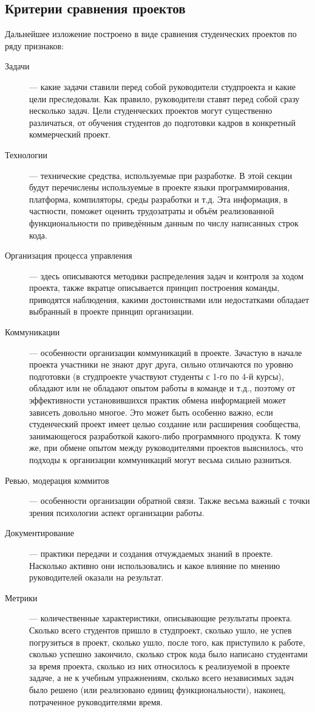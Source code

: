 \documentclass[a5paper]{article}
\begin{document}
\subsection{Критерии сравнения проектов}
Дальнейшее изложение построено в виде сравнения студенческих проектов по ряду признаков:
\begin{description}
	\item[Задачи] --- какие задачи ставили перед собой руководители студпроекта и какие цели преследовали. Как правило, руководители ставят перед собой сразу несколько задач. Цели студенческих проектов могут существенно различаться, от обучения студентов до подготовки кадров в конкретный коммерческий проект.
	\item[Технологии] --- технические средства, используемые при разработке. В этой секции будут перечислены используемые в проекте языки программирования, платформа, компиляторы, среды разработки и т.д. Эта информация, в частности, поможет оценить трудозатраты и объём реализованной функциональности по приведённым данным по числу написанных строк кода.
	\item[Организация процесса управления] --- здесь описываются методики распределения задач и контроля за ходом проекта, также вкратце описывается принцип построения команды, приводятся наблюдения, какими достоинствами или недостатками обладает выбранный в проекте принцип организации.
	\item[Коммуникации] --- особенности организации коммуникаций в проекте. Зачастую в начале проекта участники не знают друг друга, сильно отличаются по уровню подготовки (в студпроекте участвуют студенты с 1-го по 4-й курсы), обладают или не обладают опытом работы в команде и т.д., поэтому от эффективности установившихся практик обмена информацией может зависеть довольно многое. Это может быть особенно важно, если студенческий проект имеет целью создание или расширения сообщества, занимающегося разработкой какого-либо программного продукта. К тому же, при обмене опытом между руководителями проектов выяснилось, что подходы к организации коммуникаций могут весьма сильно разниться.
	\item[Ревью, модерация коммитов] --- особенности организации обратной связи. Также весьма важный с точки зрения психологии аспект организации работы.
	\item[Документирование] --- практики передачи и создания отчуждаемых знаний в проекте. Насколько активно они использовались и какое влияние по мнению руководителей оказали на результат.
	\item[Метрики] --- количественные характеристики, описывающие результаты проекта. Сколько всего студентов пришло в студпроект, сколько ушло, не успев погрузиться в проект, сколько ушло, после того, как приступило к работе, сколько успешно закончило, сколько строк кода было написано студентами за время проекта, сколько из них относилось к реализуемой в проекте задаче, а не к учебным упражнениям, сколько всего независимых задач было решено (или реализовано единиц функциональности), наконец, потраченное руководителями время.
\end{description}
\end{document}
